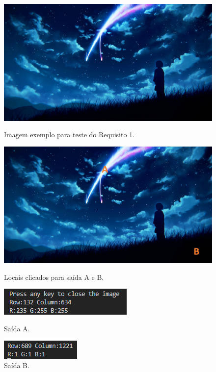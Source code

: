 \documentclass{bmvc2k}
\begin{document}
\begin{figure}[h]
    \centering
    \includegraphics[scale=0.2]{../data/kiminonawa.jpg}
    \vspace*{-2mm}\caption{Imagem exemplo para teste do Requisito 1.}
    \vspace{0.1cm}
    \includegraphics[scale=0.2]{Figs/r14.jpg}
    \vspace*{-2mm}\caption{Locais clicados para saída A e B.}
    \vspace{0.1cm}
    \includegraphics[scale=0.8]{Figs/r12.png}
    \vspace*{-2mm}\caption{Saída A.}
    \vspace{0.1cm}
    \includegraphics[scale=0.8]{Figs/r13.png}
    \vspace*{-2mm}\caption{Saída B.}
    \vspace{0.1cm}
\end{figure}
\end{document}
